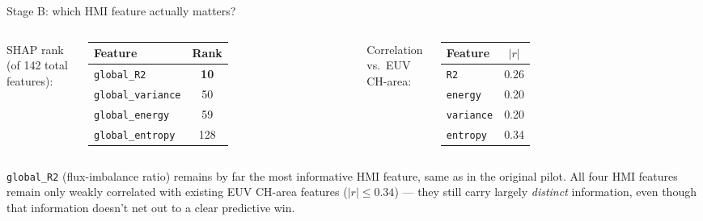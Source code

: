 \documentclass[11pt]{beamer}
\begin{document}
\begin{frame}{Stage B: which HMI feature actually matters?}
\begin{columns}
SHAP rank (of 142 total features):
\begin{table}
\small
\begin{tabular}{lc}
\toprule
Feature & Rank \\
\midrule
\texttt{global\_R2} & \textbf{10} \\
\texttt{global\_variance} & 50 \\
\texttt{global\_energy} & 59 \\
\texttt{global\_entropy} & 128 \\
\bottomrule
\end{tabular}
\end{table}
Correlation vs.\ EUV CH-area:
\begin{table}
\small
\begin{tabular}{lc}
\toprule
Feature & $|r|$ \\
\midrule
\texttt{R2} & 0.26 \\
\texttt{energy} & 0.20 \\
\texttt{variance} & 0.20 \\
\texttt{entropy} & 0.34 \\
\bottomrule
\end{tabular}
\end{table}
\end{columns}
\vspace{0.3cm}
\texttt{global\_R2} (flux-imbalance ratio) remains by far the most informative HMI feature, same as in the original pilot. All four HMI features remain only weakly correlated with existing EUV CH-area features ($|r|\le0.34$) --- they still carry largely \emph{distinct} information, even though that information doesn't net out to a clear predictive win.
\end{frame}
\end{document}
